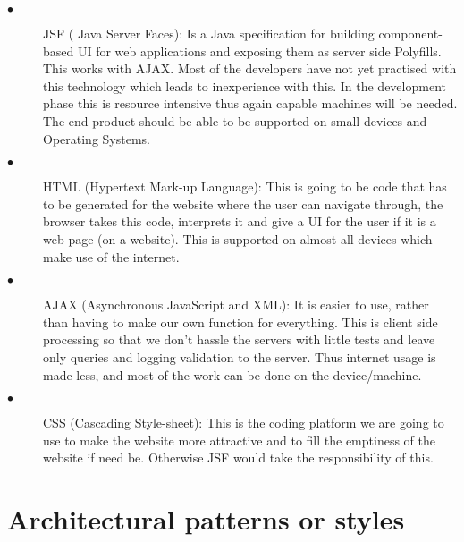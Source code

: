 \documentclass[hidelinks, 12pt]{article}
\begin{document}
\begin{description}
  \item[$\bullet$] JSF ( Java Server Faces):
  Is a Java specification for building component-based UI for web applications and exposing them as server side Polyfills. This works with AJAX. Most of the developers have not yet practised with this technology which leads to inexperience with this. In the development phase this is resource intensive thus again capable machines will be needed. The end product should be able to be supported on small devices and Operating Systems.
  
  \item[$\bullet$] HTML (Hypertext Mark-up Language):
  This is going to be code that has to be generated for the website where the user can navigate through, the browser takes this code, interprets it and give a UI for the user if it is a web-page (on a website). This is supported on almost all devices which make use of the internet.
  
  \item[$\bullet$] AJAX (Asynchronous JavaScript and XML):
  It is easier to use, rather than having to make our own function for everything. This is client side processing so that we don’t hassle the servers with little tests and leave only queries and logging validation to the server. Thus internet usage is made less, and most of the work can be done on the device/machine.
  
  \item[$\bullet$] CSS (Cascading Style-sheet):
  This is the coding platform we are going to use to make the website more attractive and to fill the emptiness of the website if need be. Otherwise JSF would take the responsibility of this.
\end{description}

\section{Architectural patterns or styles}
\end{document}
